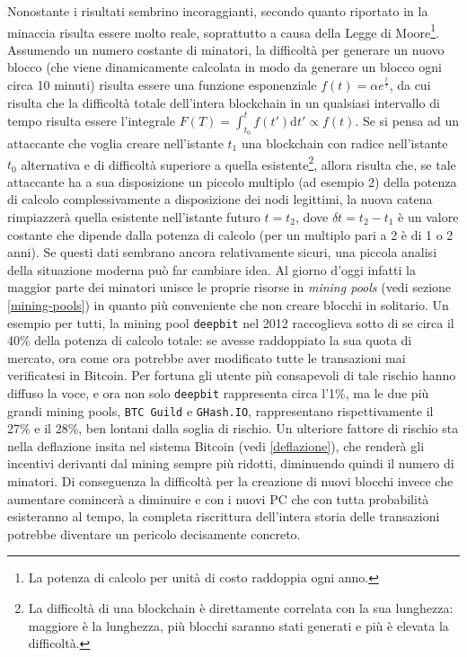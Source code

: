 Nonostante i risultati sembrino incoraggianti, secondo quanto riportato in \cite{bitter-better} la minaccia risulta essere molto reale, soprattutto a causa della Legge di Moore\footnote{La potenza di calcolo per unità di costo raddoppia ogni anno.}.
Assumendo un numero costante di minatori, la difficoltà per generare un nuovo blocco (che viene dinamicamente calcolata in modo da generare un blocco ogni circa 10 minuti) risulta essere una funzione esponenziale $f(t) = \alpha e^\frac{t}{\tau}$, da cui risulta che la difficoltà totale dell'intera blockchain in un qualsiasi intervallo di tempo risulta essere l'integrale $F(T) = \int^t_{t_0} f(t')\mathrm{d} t' \propto f(t)$.
Se si pensa ad un attaccante che voglia creare nell'istante $t_1$ una blockchain con radice nell'istante $t_0$ alternativa e di difficoltà superiore a quella esistente\footnote{La difficoltà di una blockchain è direttamente correlata con la sua lunghezza: maggiore è la lunghezza, più blocchi saranno stati generati e più è elevata la difficoltà.}, allora risulta che, se tale attaccante ha a sua disposizione un piccolo multiplo (ad esempio 2) della potenza di calcolo complessivamente a disposizione dei nodi legittimi, la nuova catena rimpiazzerà quella esistente nell'istante futuro $t=t_2$, dove $\delta t = t_2 - t_1$ è un valore costante che dipende dalla potenza di calcolo (per un multiplo pari a 2 è di 1 o 2 anni).
Se questi dati sembrano ancora relativamente sicuri, una piccola analisi della situazione moderna può far cambiare idea. Al giorno d'oggi infatti la maggior parte dei minatori unisce le proprie risorse in \emph{mining pools} (vedi sezione \ref{mining-pools}) in quanto più conveniente che non creare blocchi in solitario. Un esempio per tutti, la mining pool \verb|deepbit| nel 2012 raccoglieva sotto di se circa il 40\% della potenza di calcolo totale: se avesse raddoppiato la sua quota di mercato, ora come ora potrebbe aver modificato tutte le transazioni mai verificatesi in Bitcoin. Per fortuna gli utente più consapevoli di tale rischio hanno diffuso la voce, e ora non solo \verb|deepbit| rappresenta circa l'1\%, ma le due più grandi mining pools, \verb|BTC Guild| e \verb|GHash.IO|, rappresentano rispettivamente il 27\% e il 28\%, ben lontani dalla soglia di rischio.
Un ulteriore fattore di rischio sta nella deflazione insita nel sistema Bitcoin (vedi \ref{deflazione}), che renderà gli incentivi derivanti dal mining sempre più ridotti, diminuendo quindi il numero di minatori. Di conseguenza la difficoltà per la creazione di nuovi blocchi invece che aumentare comincerà a diminuire e con i nuovi PC che con tutta probabilità esisteranno al tempo, la completa riscrittura dell'intera storia delle transazioni potrebbe diventare un pericolo decisamente concreto.

